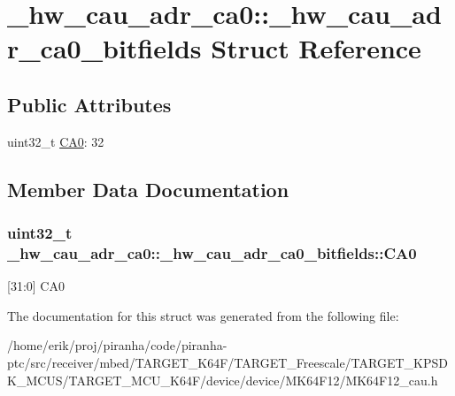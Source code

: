\hypertarget{struct__hw__cau__adr__ca0_1_1__hw__cau__adr__ca0__bitfields}{}\section{\+\_\+hw\+\_\+cau\+\_\+adr\+\_\+ca0\+:\+:\+\_\+hw\+\_\+cau\+\_\+adr\+\_\+ca0\+\_\+bitfields Struct Reference}
\label{struct__hw__cau__adr__ca0_1_1__hw__cau__adr__ca0__bitfields}
\subsection*{Public Attributes}
\begin{DoxyCompactItemize}
\item 
uint32\+\_\+t \hyperlink{struct__hw__cau__adr__ca0_1_1__hw__cau__adr__ca0__bitfields_ab11d157f4449f6c72e4f25eed4b81e9e}{C\+A0}\+: 32
\end{DoxyCompactItemize}


\subsection{Member Data Documentation}
\subsubsection[{\texorpdfstring{C\+A0}{CA0}}]{\setlength{\rightskip}{0pt plus 5cm}uint32\+\_\+t \+\_\+hw\+\_\+cau\+\_\+adr\+\_\+ca0\+::\+\_\+hw\+\_\+cau\+\_\+adr\+\_\+ca0\+\_\+bitfields\+::\+C\+A0}\hypertarget{struct__hw__cau__adr__ca0_1_1__hw__cau__adr__ca0__bitfields_ab11d157f4449f6c72e4f25eed4b81e9e}{}\label{struct__hw__cau__adr__ca0_1_1__hw__cau__adr__ca0__bitfields_ab11d157f4449f6c72e4f25eed4b81e9e}
\mbox{[}31\+:0\mbox{]} C\+A0 

The documentation for this struct was generated from the following file\+:\begin{DoxyCompactItemize}
\item 
/home/erik/proj/piranha/code/piranha-\/ptc/src/receiver/mbed/\+T\+A\+R\+G\+E\+T\+\_\+\+K64\+F/\+T\+A\+R\+G\+E\+T\+\_\+\+Freescale/\+T\+A\+R\+G\+E\+T\+\_\+\+K\+P\+S\+D\+K\+\_\+\+M\+C\+U\+S/\+T\+A\+R\+G\+E\+T\+\_\+\+M\+C\+U\+\_\+\+K64\+F/device/device/\+M\+K64\+F12/M\+K64\+F12\+\_\+cau.\+h\end{DoxyCompactItemize}
